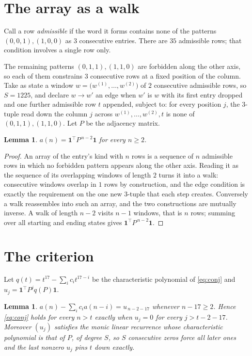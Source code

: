 \documentclass[11pt,a4paper]{article}
\theoremstyle{plain}
\newtheorem{lemma}[theorem]{Lemma}
\theoremstyle{definition}
\begin{document}
\section{The array as a walk}

Call a row \emph{admissible} if the word it forms contains none of the patterns
$(0,0,1), (1,0,0)$ as $3$ consecutive entries. There are $35$ admissible rows; that condition
involves a single row only.

The remaining patterns $(0,1,1), (1,1,0)$ are forbidden along the other axis, so each of them
constrains $3$ consecutive rows at a fixed position of the column. Take as state a
window $w=\bigl(w^{(1)},\dots,w^{(2)}\bigr)$ of $2$ consecutive admissible
rows, so $S=1225$, and declare $w\to w'$ an edge when $w'$ is $w$ with its first entry
dropped and one further admissible row $t$ appended, subject to: for every position
$j$, the $3$-tuple read down the column $j$ across $w^{(1)},\dots,w^{(2)},t$
is none of $(0,1,1), (1,1,0)$. Let $P$ be the adjacency matrix.

\begin{lemma}\label{lem:walk}
$a(n)=\mathbf{1}^{\!\top}P^{\,n-2}\mathbf{1}$ for every $n\ge2$.
\end{lemma}

\begin{proof}
An array of the entry's kind with $n$ rows is a sequence of $n$ admissible rows in
which no forbidden pattern appears along the other axis. Reading it as the sequence of its
overlapping windows of length $2$ turns it into a walk: consecutive windows overlap in
$1$ rows by construction, and the edge condition is exactly the requirement on the one
new $3$-tuple that each step creates. Conversely a walk reassembles into such an array,
and the two constructions are mutually inverse. A walk of length $n-2$ visits $n-1$
windows, that is $n$ rows; summing over all starting and ending states gives
$\mathbf{1}^{\!\top}P^{\,n-2}\mathbf{1}$.
\end{proof}

\section{The criterion}

Let $q(t)=t^{17}-\sum_i c_i t^{17-i}$ be the characteristic polynomial of
\eqref{eq:conj} and $u_j=\mathbf{1}^{\!\top}P^{j}q(P)\mathbf{1}$.

\begin{lemma}\label{lem:crit}
$a(n)-\sum_i c_i a(n-i)=u_{\,n-2-17}$ whenever $n-17\ge2$. Hence
\eqref{eq:conj} holds for every $n>t$ exactly when $u_j=0$ for every
$j>t-2-17$. Moreover $(u_j)$ satisfies the monic linear recurrence whose
characteristic polynomial is that of $P$, of degree $S$, so $S$ consecutive zeros force all
later ones and the last nonzero $u_j$ pins $t$ down exactly.
\end{lemma}
\end{document}
